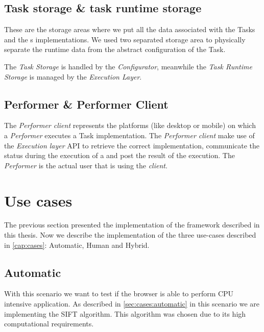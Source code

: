 \subsection{Task storage \& task runtime storage}
These are the storage areas where we put all the data associated with the Tasks
and the \utask{}s implementations. We used two separated storage area to physically
separate the runtime data from the abstract configuration of the Task.

The \emph{Task Storage} is handled by the \emph{Configurator}, meanwhile the
\emph{Task Runtime Storage} is managed by the \emph{Execution Layer}.\\



\subsection{Performer \& Performer Client}
The \emph{Performer client} represents the platforms (like desktop or mobile) on
which a \emph{Performer} executes a Task implementation. The \emph{Performer
client} make use of the \emph{Execution layer} API to retrieve the correct
implementation, communicate the status during the execution of a \utask{} and
post the result of the execution. The \emph{Performer} is the actual user that
is using the \emph{client}.






















\section{Use cases}
\label{sec:implementation:use-cases}

The previous section presented the implementation of the framework described in
this thesis. Now we describe the implementation of the three use-cases described
in \ref{cap:cases}: Automatic, Human and Hybrid.

\subsection{Automatic}
With this scenario we want to test if the browser is able to perform CPU
intensive application. As described in \ref{sec:cases:automatic} in this
scenario we are implementing the \acf{SIFT} algorithm. This algorithm
was chosen due to its high computational requirements.

